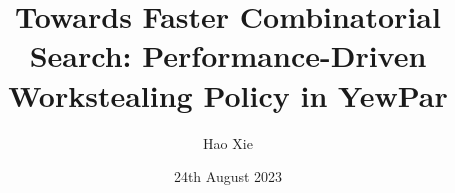 \documentclass{mproj}
\begin{document}
\title{Towards Faster Combinatorial Search: Performance-Driven Workstealing Policy in YewPar}
\author{Hao Xie}
\date{24th August 2023}
\maketitle

\begin{abstract}





\end{abstract}
\end{document}
